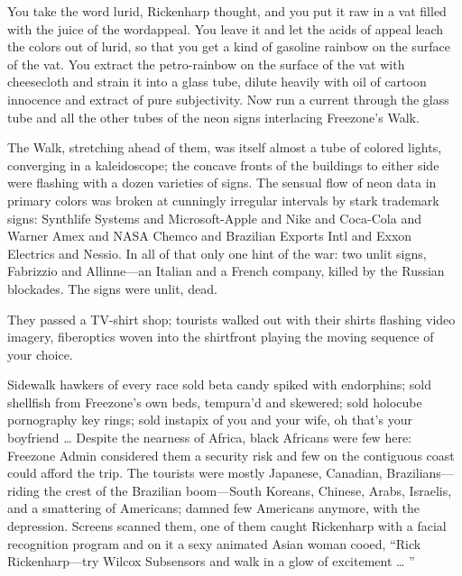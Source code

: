 You take the word lurid, Rickenharp thought, and you put it raw in a vat filled with the juice of the wordappeal. You leave it and let the acids of appeal leach the colors out of lurid, so that you get a kind of gasoline rainbow on the surface of the vat. You extract the petro-rainbow on the surface of the vat with cheesecloth and strain it into a glass tube, dilute heavily with oil of cartoon innocence and extract of pure subjectivity. Now run a current through the glass tube and all the other tubes of the neon signs interlacing Freezone’s Walk.

The Walk, stretching ahead of them, was itself almost a tube of colored lights, converging in a kaleidoscope; the concave fronts of the buildings to either side were flashing with a dozen varieties of signs. The sensual flow of neon data in primary colors was broken at cunningly irregular intervals by stark trademark signs: Synthlife Systems and Microsoft-Apple and Nike and Coca-Cola and Warner Amex and NASA Chemco and Brazilian Exports Intl and Exxon Electrics and Nessio. In all of that only one hint of the war: two unlit signs, Fabrizzio and Allinne—an Italian and a French company, killed by the Russian blockades. The signs were unlit, dead.

They passed a TV-shirt shop; tourists walked out with their shirts flashing video imagery, fiberoptics woven into the shirtfront playing the moving sequence of your choice.

Sidewalk hawkers of every race sold beta candy spiked with endorphins; sold shellfish from Freezone’s own beds, tempura’d and skewered; sold holocube pornography key rings; sold instapix of you and your wife, oh that’s your boyfriend … Despite the nearness of Africa, black Africans were few here: Freezone Admin considered them a security risk and few on the contiguous coast could afford the trip. The tourists were mostly Japanese, Canadian, Brazilians—riding the crest of the Brazilian boom—South Koreans, Chinese, Arabs, Israelis, and a smattering of Americans; damned few Americans anymore, with the depression. Screens scanned them, one of them caught Rickenharp with a facial recognition program and on it a sexy animated Asian woman cooed, “Rick Rickenharp—try Wilcox Subsensors and walk in a glow of excitement … ”

